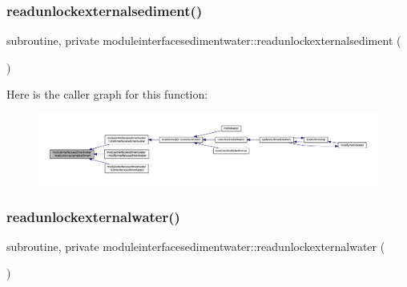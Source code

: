 \subsubsection{\texorpdfstring{readunlockexternalsediment()}{readunlockexternalsediment()}}
{\footnotesize\ttfamily subroutine, private moduleinterfacesedimentwater\+::readunlockexternalsediment (\begin{DoxyParamCaption}{ }\end{DoxyParamCaption})\hspace{0.3cm}{\ttfamily [private]}}

Here is the caller graph for this function\+:\nopagebreak
\begin{figure}[H]
\begin{center}
\leavevmode
\includegraphics[width=350pt]{namespacemoduleinterfacesedimentwater_a6b368a5d3a18b3829f9bd022591d794a_icgraph}
\end{center}
\end{figure}
\mbox{\label{namespacemoduleinterfacesedimentwater_a23d9e5cbe8c23621607cbca34d93c7f0}} 
\subsubsection{\texorpdfstring{readunlockexternalwater()}{readunlockexternalwater()}}
{\footnotesize\ttfamily subroutine, private moduleinterfacesedimentwater\+::readunlockexternalwater (\begin{DoxyParamCaption}{ }\end{DoxyParamCaption})\hspace{0.3cm}{\ttfamily [private]}}

